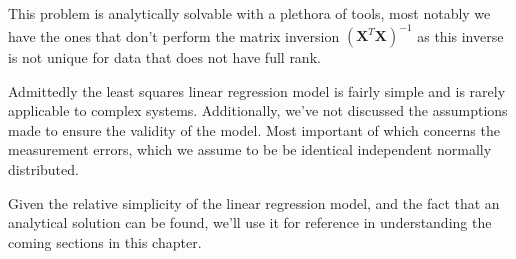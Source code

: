  \noindent This problem is analytically solvable with a plethora of tools, most notably we have the ones that don't perform the matrix inversion $(\mathbf{X}^T \mathbf{X})^{-1}$ as this inverse is not unique for data that does not have full rank.

Admittedly the least squares linear regression model is fairly simple and is rarely applicable to complex systems. Additionally, we've not discussed the assumptions made to ensure the validity of the model. Most important of which concerns the measurement errors, which we assume to be be identical independent normally distributed.

Given the relative simplicity of the linear regression model, and the fact that an analytical solution can be found, we'll use it for reference in understanding the coming sections in this chapter.




